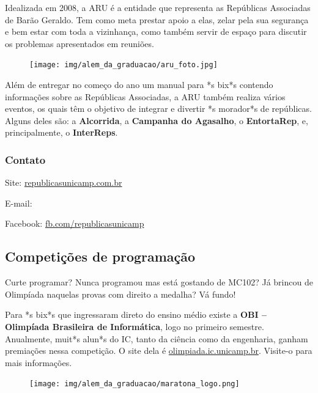 Idealizada em 2008, a ARU é a entidade que representa as Repúblicas Associadas
de Barão Geraldo.  Tem como meta prestar apoio a elas, zelar pela sua segurança
e bem estar com toda a vizinhança, como também servir de espaço para discutir
os problemas apresentados em reuniões.

\begin{figure}[H]
  \centering
  \texttt{[image: img/alem\_da\_graduacao/aru\_foto.jpg]}
\end{figure}

Além de entregar no começo do ano um manual para *s bix*s contendo informações
sobre as Repúblicas Associadas, a ARU também realiza vários eventos, os quais
têm o objetivo de integrar e divertir *s morador*s de repúblicas. Alguns deles
são: a \textbf{Alcorrida}, a \textbf{Campanha do Agasalho}, o
\textbf{EntortaRep}, e, principalmente, o \textbf{InterReps}.

\subsubsection{Contato}

\begin{compactitemize}
\item Site: \url{republicasunicamp.com.br}
\item E-mail: 
\item Facebook: \url{fb.com/republicasunicamp}
\end{compactitemize}

\subsection{Competições de programação}

Curte programar? Nunca programou mas está gostando de MC102? Já brincou de
Olimpíada naquelas provas com direito a medalha? Vá fundo!

Para *s bix*s que ingressaram direto do ensino médio existe a \textbf{OBI --
Olimpíada Brasileira de Informática}, logo no primeiro semestre.  Anualmente,
muit*s alun*s do IC, tanto da ciência como da engenharia, ganham premiações
nessa competição. O site dela é \url{olimpiada.ic.unicamp.br}.  Visite-o para
mais informações.

\begin{figure}[h!]
  \centering
  \texttt{[image: img/alem\_da\_graduacao/maratona\_logo.png]}
\end{figure}

